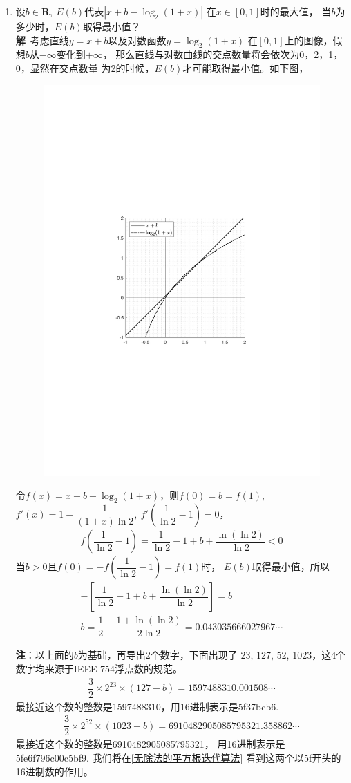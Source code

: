 \begin{enumerate}[label={【\textbf{例\thechapter.\arabic*}】},
 leftmargin=\inteval{\myenumleftmargin}pt,
 itemsep=\inteval{\myenumitempsep}pt,
 itemindent=\inteval{\myenumitemindent}pt]
\item\label{魔术数0x5f3759df}  
设$ b\in \textbf{R},\ E(b) $代表$ |x+b-\log_2(1+x)| $
在$ x\in[0,1] $时的最大值，
当$ b $为多少时，$ E(b) $取得最小值？\\
\textbf{解}\ 考虑直线$ y=x+b $以及对数函数$ y=\log_2(1+x) $
在$ [0,1] $上的图像，假想$ b $从$ -\infty $变化到$ +\infty $，
那么直线与对数曲线的交点数量将会依次为0，2，1，0，显然在交点数量
为2的时候，$ E(b) $才可能取得最小值。如下图，
\begin{figure}[h]
    \centering
    \includegraphics[width=0.5\linewidth]{PDF_Picture/x+b-log2(1+x)最大最小值}
\end{figure}
令$ f(x)=x+b-\log_2(1+x) $，则$ f(0)=b=f(1) $,
$ f'(x)=1-\dfrac{1}{(1+x)\ln2},\ f'\left(\dfrac{1}{\ln2}-1
\right)=0 $，
\begin{gather*}
    f\left(\dfrac{1}{\ln2}-1\right)=
    \dfrac{1}{\ln2}-1+b+\dfrac{\ln(\ln2)}{\ln2}<0
\end{gather*}
当$ b>0 $且$ f(0)=-f\left(\dfrac{1}{\ln2}-1\right)=f(1) $时，
$ E(b) $取得最小值，所以
\begin{gather*}
    -\left[\dfrac{1}{\ln2}-1+b+\dfrac{\ln(\ln2)}{\ln2}\right]=b\\
    b=\dfrac{1}{2}-\dfrac{1+\ln(\ln2)}{2\ln2}=0.043035666027967\cdots
\end{gather*}

\textbf{注}：以上面的$ b $为基础，再导出2个数字，下面出现了
23, 127, 52, 1023，这4个数字均来源于IEEE 754浮点数的规范。
\begin{gather*}
    \dfrac{3}{2}\times 2^{23}\times(127-b)=
    1597488310.001508\cdots
\end{gather*} 
最接近这个数的整数是1597488310，用16进制表示是5f37bcb6.
\begin{gather*}                
    \dfrac{3}{2}\times 2^{52}\times(1023-b)=
    6910482905085795321.358862\cdots              
\end{gather*}
最接近这个数的整数是6910482905085795321，
用16进制表示是5fe6f796c00c5bf9. 
我们将在\ref{无除法的平方根迭代算法}
看到这两个以5f开头的16进制数的作用。


\end{enumerate}
